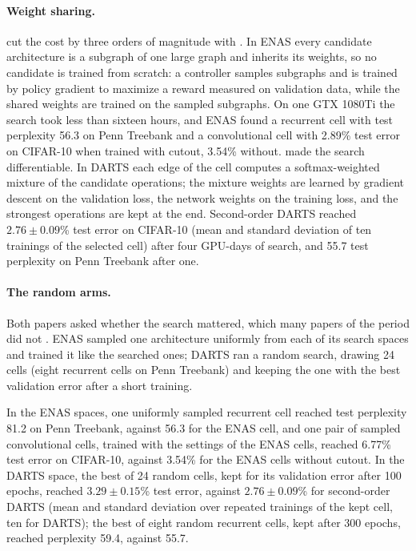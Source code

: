 \begin{refsection}
\paragraph{Weight sharing.} \Textcite{PhamEtAl2018} cut the cost by three orders of magnitude with . In ENAS every candidate architecture is a subgraph of one large graph and inherits its weights, so no candidate is trained from scratch: a controller samples subgraphs and is trained by policy gradient to maximize a reward measured on validation data, while the shared weights are trained on the sampled subgraphs. On one GTX 1080Ti the search took less than sixteen hours, and ENAS found a recurrent cell with test perplexity 56.3 on Penn Treebank and a convolutional cell with 2.89\% test error on CIFAR-10 when trained with cutout, 3.54\% without. \Textcite{LiuSimonyanYang2019} made the search differentiable. In DARTS each edge of the cell computes a softmax-weighted mixture of the candidate operations; the mixture weights are learned by gradient descent on the validation loss, the network weights on the training loss, and the strongest operations are kept at the end. Second-order DARTS reached $2.76\pm0.09$\% test error on CIFAR-10 (mean and standard deviation of ten trainings of the selected cell) after four GPU-days of search, and 55.7 test perplexity on Penn Treebank after one.

\paragraph{The random arms.} Both papers asked whether the search mattered, which many papers of the period did not \parencite{LindauerHutter2020}. ENAS sampled one architecture uniformly from each of its search spaces and trained it like the searched ones; DARTS ran a random search, drawing 24 cells (eight recurrent cells on Penn Treebank) and keeping the one with the best validation error after a short training.

\begin{finding}\label{fd:controls:claim}
In the ENAS spaces, one uniformly sampled recurrent cell reached test perplexity 81.2 on Penn Treebank, against 56.3 for the ENAS cell, and one pair of sampled convolutional cells, trained with the settings of the ENAS cells, reached 6.77\% test error on CIFAR-10, against 3.54\% for the ENAS cells without cutout. In the DARTS space, the best of 24 random cells, kept for its validation error after 100 epochs, reached $3.29\pm0.15$\% test error, against $2.76\pm0.09$\% for second-order DARTS (mean and standard deviation over repeated trainings of the kept cell, ten for DARTS); the best of eight random recurrent cells, kept after 300 epochs, reached perplexity 59.4, against 55.7.
\end{finding}


\end{refsection}
